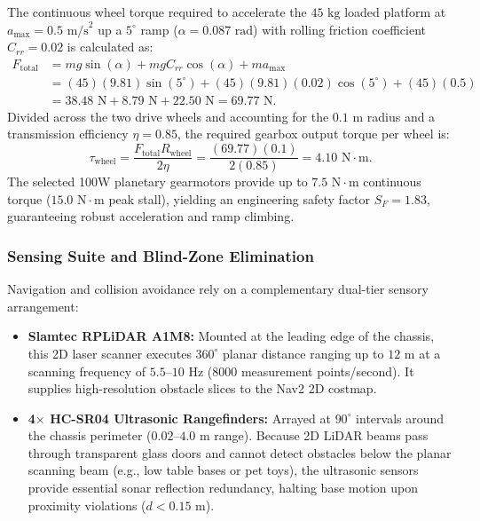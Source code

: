 The continuous wheel torque required to accelerate the $45\text{ kg}$ loaded platform at $a_{\text{max}} = 0.5\text{ m/s}^2$ up a $5^\circ$ ramp ($\alpha = 0.087\text{ rad}$) with rolling friction coefficient $C_{rr} = 0.02$ is calculated as:
\begin{align}
  F_{\text{total}} &= m g \sin(\alpha) + m g C_{rr} \cos(\alpha) + m a_{\text{max}} \nonumber \\
  &= (45)(9.81)\sin(5^\circ) + (45)(9.81)(0.02)\cos(5^\circ) + (45)(0.5) \nonumber \\
  &= 38.48\text{ N} + 8.79\text{ N} + 22.50\text{ N} = 69.77\text{ N}.
\end{align}
Divided across the two drive wheels and accounting for the $0.1\text{ m}$ radius and a transmission efficiency $\eta = 0.85$, the required gearbox output torque per wheel is:
\begin{equation}
  \tau_{\text{wheel}} = \frac{F_{\text{total}} R_{\text{wheel}}}{2 \eta} = \frac{(69.77)(0.1)}{2 (0.85)} = 4.10\text{ N}\cdot\text{m}.
\end{equation}
The selected 100W planetary gearmotors provide up to $7.5\text{ N}\cdot\text{m}$ continuous torque ($15.0\text{ N}\cdot\text{m}$ peak stall), yielding an engineering safety factor $S_F = 1.83$, guaranteeing robust acceleration and ramp climbing.

\subsubsection{Sensing Suite and Blind-Zone Elimination}
Navigation and collision avoidance rely on a complementary dual-tier sensory arrangement:
\begin{itemize}[leftmargin=1.5em]
  \item \textbf{Slamtec RPLiDAR A1M8:} Mounted at the leading edge of the chassis, this 2D laser scanner executes $360^\circ$ planar distance ranging up to $12\text{ m}$ at a scanning frequency of $5.5\text{--}10\text{ Hz}$ (8000 measurement points/second). It supplies high-resolution obstacle slices to the Nav2 2D costmap.
  \item \textbf{4$\times$ HC-SR04 Ultrasonic Rangefinders:} Arrayed at $90^\circ$ intervals around the chassis perimeter ($0.02\text{--}4.0\text{ m}$ range). Because 2D LiDAR beams pass through transparent glass doors and cannot detect obstacles below the planar scanning beam (e.g., low table bases or pet toys), the ultrasonic sensors provide essential sonar reflection redundancy, halting base motion upon proximity violations ($d < 0.15\text{ m}$).
\end{itemize}

